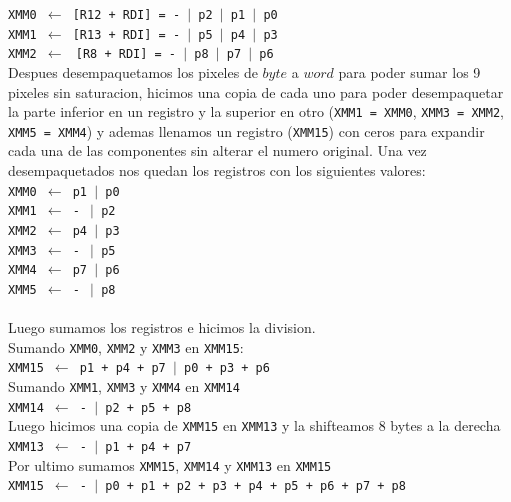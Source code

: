\noindent
\texttt{XMM0 $\gets$ [R12 + RDI] = - $\vert$ p2 $\vert$ p1 $\vert$ p0}\\
\texttt{XMM1 $\gets$ [R13 + RDI] = - $\vert$ p5 $\vert$ p4 $\vert$ p3}\\
\texttt{XMM2 $\gets$ $\ $[R8  + RDI] = - $\vert$ p8 $\vert$ p7 $\vert$ p6}\\

Despues desempaquetamos los pixeles de $byte$ a $word$ para poder sumar los 9 pixeles sin saturacion, hicimos una copia de cada uno para poder desempaquetar la parte inferior en un registro y la superior en otro (\texttt{XMM1 = XMM0}, \texttt{XMM3 = XMM2}, \texttt{XMM5 = XMM4}) y ademas llenamos un registro (\texttt{XMM15}) con ceros para expandir cada una de las componentes sin alterar el numero original.
Una vez desempaquetados nos quedan los registros con los siguientes valores:\\

\noindent
\texttt{XMM0 $\gets$ p1 $\vert$ p0} \\
\texttt{XMM1 $\gets$ - $\ \vert$ p2} \\
\texttt{XMM2 $\gets$ p4 $\vert$ p3} \\
\texttt{XMM3 $\gets$ - $\ \vert$ p5} \\ 
\texttt{XMM4 $\gets$ p7 $\vert$ p6} \\
\texttt{XMM5 $\gets$ - $\ \vert$ p8} \\
\\
Luego sumamos los registros e hicimos la division. \\

Sumando \texttt{XMM0}, \texttt{XMM2} y \texttt{XMM3} en \texttt{XMM15}: \\
	\texttt{XMM15 $\gets$ p1 + p4 + p7 $\vert$ p0 + p3 + p6}	\\

Sumando \texttt{XMM1}, \texttt{XMM3} y \texttt{XMM4} en \texttt{XMM14}	\\
	\texttt{XMM14 $\gets$ - $\vert$ p2 + p5 + p8} \\

Luego hicimos una copia de \texttt{XMM15} en \texttt{XMM13} y la shifteamos 8 bytes a la derecha \\
	\texttt{XMM13 $\gets$ - $\vert$ p1 + p4 + p7} \\

Por ultimo sumamos \texttt{XMM15}, \texttt{XMM14} y \texttt{XMM13} en \texttt{XMM15} \\
	\texttt{XMM15 $\gets$ - $\vert$ p0 + p1 + p2 + p3 + p4 + p5 + p6 + p7 + p8} \\

